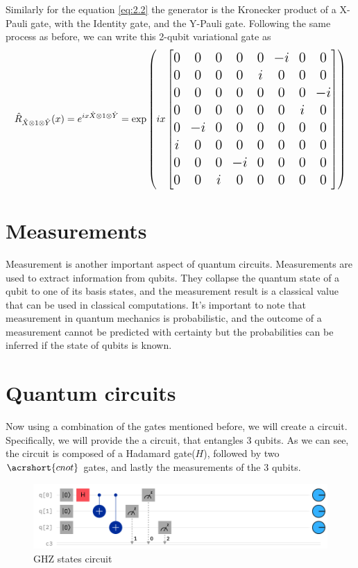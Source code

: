 \documentclass[inscr,ack,preface]{diphdthesis}
\begin{document}
Similarly for the equation {\ref{eq:2.2}} the generator is the Kronecker product of a X-Pauli gate, with the Identity gate, and the Y-Pauli gate. 
Following the same process as before, we can write this 2-qubit variational gate as 
\[\Large\hat{R}_{\hat{X}\otimes 1\otimes \hat{Y}}(x)=e^{  i x \hat{X}\otimes 1\otimes\hat{Y}} = \exp \left(i x \begin{bmatrix} 0 & 0 & 0 & 0 & 0 & -i & 0 & 0 \\ 0 & 0 & 0 & 0 & i & 0 & 0 & 0 \\ 0 & 0 & 0 & 0 & 0 & 0 & 0 & -i \\ 0 & 0 & 0 & 0 & 0 & 0 & i & 0 \\ 0 & -i & 0 & 0 & 0 & 0 & 0 & 0 \\ i & 0 & 0 & 0 & 0 & 0 & 0 & 0 \\ 0 & 0 & 0 & -i & 0 & 0 & 0 & 0 \\ 0 & 0 & i & 0 & 0 & 0 & 0 & 0  \end{bmatrix} \right)\] \normalsize

\section{Measurements}

Measurement is another important aspect of quantum circuits. Measurements are used to extract information from \acrshort{qubit}s. They collapse the quantum state of a \acrshort{qubit} to one of its basis states, and the measurement result is a classical value that can be used in classical computations. It's important to note that measurement in quantum mechanics is probabilistic, and the outcome of a measurement cannot be predicted with certainty but the probabilities can be inferred if the state of qubits is known.

\section{Quantum circuits}

Now using a combination of the gates mentioned before, we will create a circuit. Specifically, we will provide the a circuit, that entangles 3 \acrshort{qubit}s. As we can see, the circuit is composed of a Hadamard gate($H$), followed by two $\acrshort{cnot}$ gates, and lastly the measurements of the 3 \acrshort{qubit}s. \cite{ibm}
\begin{figure}[ht]
    \includegraphics[width=1\textwidth]{ghz.png}
    \caption{GHZ states circuit}
    \label{fig:enter-label}
\end{figure}
\end{document}
